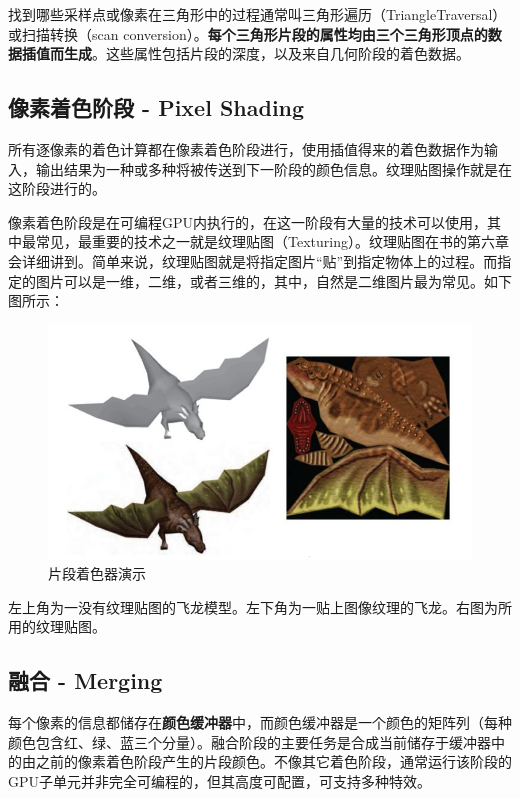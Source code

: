 \documentclass[UTF8,a4paper,12pt]{ctexbook}
\begin{document}
				找到哪些采样点或像素在三角形中的过程通常叫三角形遍历（TriangleTraversal）或扫描转换（scan conversion）。\textbf{每个三角形片段的属性均由三个三角形顶点的数据插值而生成}。这些属性包括片段的深度，以及来自几何阶段的着色数据。

			\subsection{像素着色阶段 - Pixel Shading}
				所有逐像素的着色计算都在像素着色阶段进行，使用插值得来的着色数据作为输入，输出结果为一种或多种将被传送到下一阶段的颜色信息。纹理贴图操作就是在这阶段进行的。
				
				像素着色阶段是在可编程GPU内执行的，在这一阶段有大量的技术可以使用，其中最常见，最重要的技术之一就是纹理贴图（Texturing）。纹理贴图在书的第六章会详细讲到。简单来说，纹理贴图就是将指定图片“贴”到指定物体上的过程。而指定的图片可以是一维，二维，或者三维的，其中，自然是二维图片最为常见。如下图所示：
					\begin{figure}[H]
						\centering
						\includegraphics[scale=0.57]{PixShader}
						\caption{片段着色器演示}
					\end{figure}
				
				左上角为一没有纹理贴图的飞龙模型。左下角为一贴上图像纹理的飞龙。右图为所用的纹理贴图。
				
			\subsection{融合 - Merging}
				每个像素的信息都储存在\textbf{颜色缓冲器}中，而颜色缓冲器是一个颜色的矩阵列（每种颜色包含红、绿、蓝三个分量）。融合阶段的主要任务是合成当前储存于缓冲器中的由之前的像素着色阶段产生的片段颜色。不像其它着色阶段，通常运行该阶段的GPU子单元并非完全可编程的，但其高度可配置，可支持多种特效。
				
\end{document}
